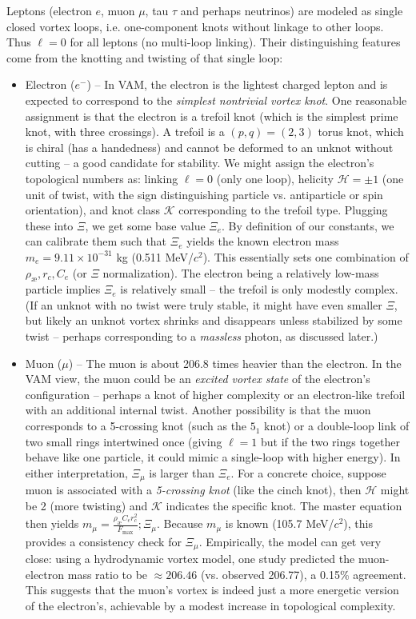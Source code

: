 Leptons (electron $e$, muon $\mu$, tau $\tau$ and perhaps neutrinos) are modeled as single closed vortex loops, i.e. one-component knots without linkage to other loops. Thus $\ell=0$ for all leptons (no multi-loop linking). Their distinguishing features come from the knotting and twisting of that single loop:\begin{itemize}

\item
Electron ($e^-$) – In VAM, the electron is the lightest charged lepton and is expected to correspond to the \textit{simplest nontrivial vortex knot}. One reasonable assignment is that the electron is a trefoil knot (which is the simplest prime knot, with three crossings). A trefoil is a $(p,q)=(2,3)$ torus knot, which is chiral (has a handedness) and cannot be deformed to an unknot without cutting – a good candidate for stability. We might assign the electron’s topological numbers as: linking $\ell=0$ (only one loop), helicity $\mathcal{H}= \pm 1$ (one unit of twist, with the sign distinguishing particle vs. antiparticle or spin orientation), and knot class $\mathcal{K}$ corresponding to the trefoil type. Plugging these into $\Xi$, we get some base value $\Xi_e$. By definition of our constants, we can calibrate them such that $\Xi_e$ yields the known electron mass $m_e = 9.11\times10^{-31}$ kg (0.511 MeV/$c^2$). This essentially sets one combination of $\rho_{\text{\ae}}, r_c, C_e$ (or $\Xi$ normalization). The electron being a relatively low-mass particle implies $\Xi_e$ is relatively small – the trefoil is only modestly complex. (If an unknot with no twist were truly stable, it might have even smaller $\Xi$, but likely an unknot vortex shrinks and disappears unless stabilized by some twist – perhaps corresponding to a \textit{massless} photon, as discussed later.)

\item
Muon ($\mu$) – The muon is about 206.8 times heavier than the electron. In the VAM view, the muon could be an \textit{excited vortex state} of the electron’s configuration – perhaps a knot of higher complexity or an electron-like trefoil with an additional internal twist. Another possibility is that the muon corresponds to a 5-crossing knot (such as the ${5_1}$ knot) or a double-loop link of two small rings intertwined once (giving $\ell=1$ but if the two rings together behave like one particle, it could mimic a single-loop with higher energy). In either interpretation, $\Xi_\mu$ is larger than $\Xi_e$. For a concrete choice, suppose muon is associated with a \textit{5-crossing knot} (like the cinch knot), then $\mathcal{H}$ might be 2 (more twisting) and $\mathcal{K}$ indicates the specific knot. The master equation then yields $m_\mu = \frac{\rho_{\text{\ae}}C_e r_c^2}{F_{\max}};\Xi_\mu$. Because $m_\mu$ is known (105.7 MeV/$c^2$), this provides a consistency check for $\Xi_\mu$. Empirically, the model can get very close: using a hydrodynamic vortex model, one study predicted the muon-electron mass ratio to be $\approx 206.46$ (vs. observed 206.77), a 0.15\% agreement. This suggests that the muon’s vortex is indeed just a more energetic version of the electron’s, achievable by a modest increase in topological complexity.


\end{itemize}

